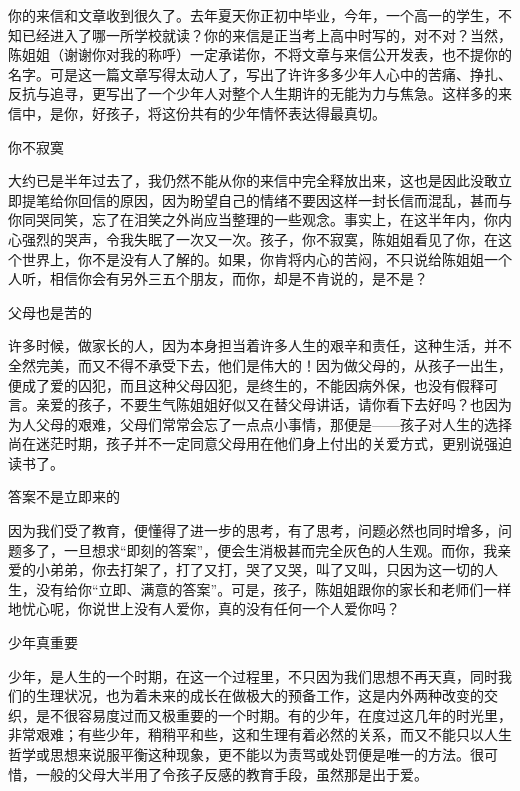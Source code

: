 \par {}
\par 你的来信和文章收到很久了。去年夏天你正初中毕业，今年，一个高一的学生，不知已经进入了哪一所学校就读？你的来信是正当考上高中时写的，对不对？当然，陈姐姐（谢谢你对我的称呼）一定承诺你，不将文章与来信公开发表，也不提你的名字。可是这一篇文章写得太动人了，写出了许许多多少年人心中的苦痛、挣扎、反抗与追寻，更写出了一个少年人对整个人生期许的无能为力与焦急。这样多的来信中，是你，好孩子，将这份共有的少年情怀表达得最真切。
\begin{center}
    \par 你不寂寞
\end{center}
\par 大约已是半年过去了，我仍然不能从你的来信中完全释放出来，这也是因此没敢立即提笔给你回信的原因，因为盼望自己的情绪不要因这样一封长信而混乱，甚而与你同哭同笑，忘了在泪笑之外尚应当整理的一些观念。事实上，在这半年内，你内心强烈的哭声，令我失眠了一次又一次。孩子，你不寂寞，陈姐姐看见了你，在这个世界上，你不是没有人了解的。如果，你肯将内心的苦闷，不只说给陈姐姐一个人听，相信你会有另外三五个朋友，而你，却是不肯说的，是不是？
\begin{center}
    \par 父母也是苦的
\end{center}
\par 许多时候，做家长的人，因为本身担当着许多人生的艰辛和责任，这种生活，并不全然完美，而又不得不承受下去，他们是伟大的！因为做父母的，从孩子一出生，便成了爱的囚犯，而且这种父母囚犯，是终生的，不能因病外保，也没有假释可言。亲爱的孩子，不要生气陈姐姐好似又在替父母讲话，请你看下去好吗？也因为为人父母的艰难，父母们常常会忘了一点点小事情，那便是——孩子对人生的选择尚在迷茫时期，孩子并不一定同意父母用在他们身上付出的关爱方式，更别说强迫读书了。
\begin{center}
    \par 答案不是立即来的
\end{center}
\par 因为我们受了教育，便懂得了进一步的思考，有了思考，问题必然也同时增多，问题多了，一旦想求“即刻的答案”，便会生消极甚而完全灰色的人生观。而你，我亲爱的小弟弟，你去打架了，打了又打，哭了又哭，叫了又叫，只因为这一切的人生，没有给你“立即、满意的答案”。可是，孩子，陈姐姐跟你的家长和老师们一样地忧心呢，你说世上没有人爱你，真的没有任何一个人爱你吗？
\begin{center}
    \par 少年真重要  
\end{center}
\par 少年，是人生的一个时期，在这一个过程里，不只因为我们思想不再天真，同时我们的生理状况，也为着未来的成长在做极大的预备工作，这是内外两种改变的交织，是不很容易度过而又极重要的一个时期。有的少年，在度过这几年的时光里，非常艰难；有些少年，稍稍平和些，这和生理有着必然的关系，而又不能只以人生哲学或思想来说服平衡这种现象，更不能以为责骂或处罚便是唯一的方法。很可惜，一般的父母大半用了令孩子反感的教育手段，虽然那是出于爱。
